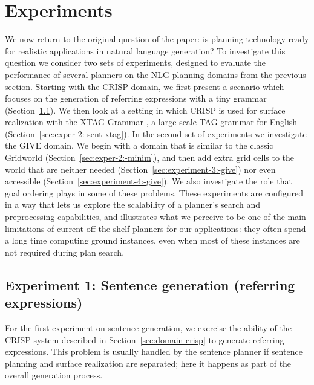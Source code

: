\section{Experiments}
\label{sec:experiments}

We now return to the original question of the paper: is planning technology
ready for realistic applications in natural language generation? To investigate
this question we consider two sets of experiments, designed to evaluate the
performance of several planners on the NLG planning domains from the previous
section. Starting with the CRISP domain, we first present a scenario which
focuses on the generation of referring expressions with a tiny grammar
(Section~\ref{sec:exper-1:-sent}). We then look at a setting in which CRISP is
used for surface realization with the XTAG Grammar \citep{xtag01:_tr}, a
large-scale TAG grammar for English (Section~\ref{sec:exper-2:-sent-xtag}). In
the second set of experiments we investigate the GIVE domain. We begin with a
domain that is similar to the classic Gridworld
(Section~\ref{sec:exper-2:-minim}), and then add extra grid cells to the world
that are neither needed (Section~\ref{sec:experiment-3:-give}) nor even
accessible (Section~\ref{sec:experiment-4:-give}). We also investigate the role
that goal ordering plays in some of these problems. These experiments are
configured in a way that lets us explore the scalability of a planner's search
and preprocessing capabilities, and illustrates what we perceive to be one of
the main limitations of current off-the-shelf planners for our applications:
they often spend a long time computing ground instances, even when most of
these instances are not required during plan search.



\subsection{Experiment 1: Sentence generation (referring expressions)}
\label{sec:exper-1:-sent}

For the first experiment on sentence generation, we exercise the
ability of the CRISP system described in
Section~\ref{sec:domain-crisp} to generate referring expressions. This
problem is usually handled by the sentence planner if sentence
planning and surface realization are separated; here it happens as
part of the overall generation process. 

